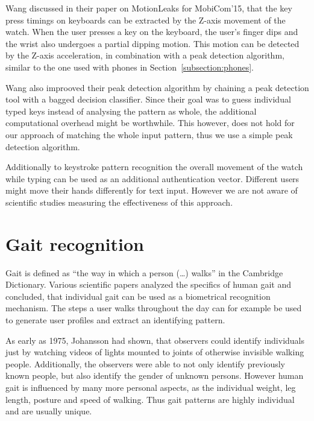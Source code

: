 Wang \etal\cite{wang2015mole} discussed in their paper on MotionLeaks for MobiCom'15, that the key press timings on keyboards can be extracted by the Z-axis movement of the watch. When the user presses a key on the keyboard, the user's finger dips and the wrist also undergoes a partial dipping motion. This motion can be detected by the Z-axis acceleration, in combination with a peak detection algorithm, similar to the one used with phones in Section~\ref{subsection:phones}.

Wang \etal also improoved their peak detection algorithm by chaining a peak detection tool with a bagged decision classifier. Since their goal was to guess individual typed keys instead of analysing the pattern as whole, the additional computational overhead might be worthwhile. This however, does not hold for our approach of matching the whole  input pattern, thus we use a simple peak detection algorithm.

Additionally to keystroke pattern recognition the overall movement of the watch while typing can be used as an additional authentication vector. Different users might move their hands differently for text input. However we are not aware of scientific studies measuring the effectiveness of this approach.

\section{Gait recognition}
Gait is defined as ``the way in which a person (\ldots) walks'' in the Cambridge Dictionary. Various scientific papers analyzed the specifics of human gait\cite{johansson1975visual, lee2002gait, johnstonsmartwatch} and concluded, that individual gait can be used as a biometrical recognition mechanism. The steps a user walks throughout the day can for example be used to generate user profiles and extract an identifying pattern. 

As early as 1975, Johansson\cite{johansson1975visual} had shown, that observers could identify individuals just by watching videos of lights mounted to joints of otherwise invisible walking people. Additionally, the observers were able to not only identify previously known people, but also identify the gender of unknown persons. However human gait is influenced by many more personal aspects, as the individual weight, leg length, posture and speed of walking. Thus gait patterns are highly individual and are usually unique.
